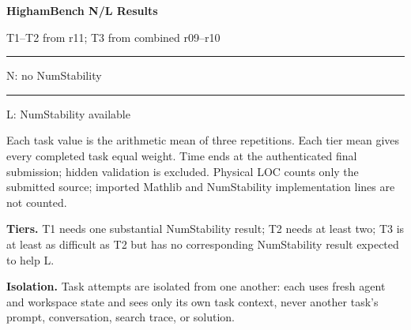 \documentclass[10pt]{article}
\newcommand{\conditionlegend}{%
  \textcolor{NBlue}{\rule{1.1em}{0.7em}}\;N: no NumStability
  \qquad
  \textcolor{LOrange}{\rule{1.1em}{0.7em}}\;L: NumStability available}
\begin{document}
\begin{center}
  {\LARGE\bfseries\color{Ink} HighamBench N/L Results}\par
  \vspace{2pt}
  {\large T1--T2 from r11; T3 from combined r09--r10}\par
  \vspace{4pt}
  \conditionlegend
\end{center}

\colorbox{NoteBg}{\parbox{0.975\textwidth}{\small
Each task value is the arithmetic mean of three repetitions. Each tier mean gives every completed task equal weight. Time ends at the authenticated final submission; hidden validation is excluded. Physical LOC counts only the submitted source; imported Mathlib and NumStability implementation lines are not counted.}}

{\small\bfseries Tiers.} {\small T1 needs one substantial NumStability result; T2 needs at least two; T3 is at least as difficult as T2 but has no corresponding NumStability result expected to help L.}

{\small\bfseries Isolation.} {\small Task attempts are isolated from one another: each uses fresh agent and workspace state and sees only its own task context, never another task's prompt, conversation, search trace, or solution.}
\end{document}
